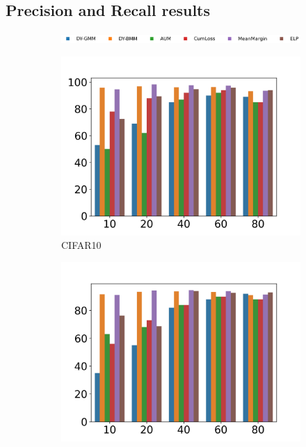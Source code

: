 \documentclass{article}
\begin{document}
\newpage






\subsection{Precision and Recall results}
\label{app:precisionandrecall}


\begin{figure}[h]
    \centering
    \begin{subfigure}[b]{.88\textwidth}
        \includegraphics[width=\textwidth]{figs/F1legend.png}
    \vspace{-.5cm}
    \end{subfigure}
    \begin{subfigure}[b]{0.22\textwidth}
        \includegraphics[width=\textwidth]{figs/c10pbar.png}
        \vspace{-.5cm}
        \caption{ CIFAR10}
    \end{subfigure}
    \begin{subfigure}[b]{0.22\textwidth}
        \includegraphics[width=\textwidth]{figs/c100pbar.png}

\end{subfigure}
\end{figure}
\end{document}
